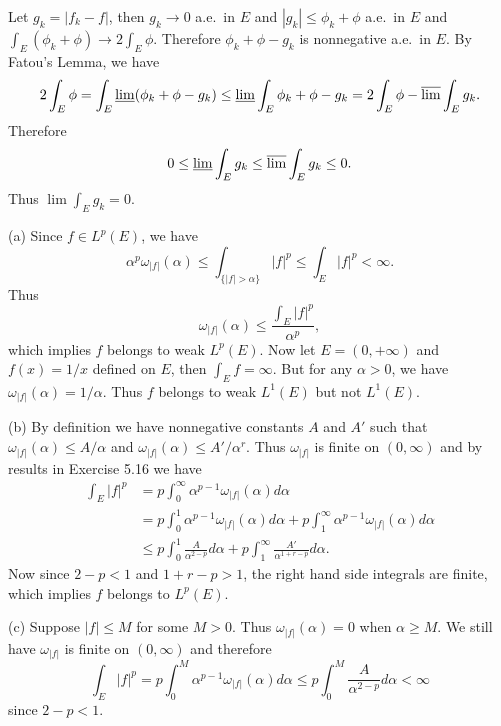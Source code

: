 \begin{exercise}{5.23}
  Let $g_k=|f_k-f|$, then $g_k\rightarrow 0$ a.e.\ in $E$
  and $|g_k|\leq \phi_k+\phi$ a.e.\ in $E$
  and $\int_E(\phi_k+\phi)\rightarrow 2\int_E\phi.$
  Therefore $\phi_k+\phi-g_k$ is nonnegative a.e.\ in $E$.
  By Fatou's Lemma, we have
  \[2\int_E\phi=\int_E\varliminf(\phi_k+\phi-g_k)\leq\varliminf\int_E\phi_k+\phi-g_k=2\int_E\phi-\varlimsup\int_Eg_k.\]
  Therefore \[0\leq\varliminf\int_E g_k\leq\varlimsup\int_Eg_k\leq 0.\]
  Thus $\lim\int_Eg_k=0.$
\end{exercise}

\begin{exercise}{5.24}
(a) Since $f\in L^p(E)$,
we have \[\alpha^p\omega_{|f|}(\alpha)\leq\int_{\{|f|>\alpha\}}|f|^p\leq\int_E|f|^p<\infty.\]
Thus \[\omega_{|f|}(\alpha)\leq\frac{\int_E|f|^p}{\alpha^p},\]
which implies $f$ belongs to weak $L^p(E)$.
Now let $E=(0,+\infty)$ and $f(x)=1/x$ defined on $E$,
then $\int_E f=\infty$.
But for any $\alpha>0$, we have $\omega_{|f|}(\alpha)=1/\alpha$.
Thus $f$ belongs to weak $L^1(E)$ but not $L^1(E)$.

(b) By definition we have nonnegative constants $A$ and $A'$ such that
$\omega_{|f|}(\alpha)\leq A/\alpha$ and $\omega_{|f|}(\alpha)\leq A'/\alpha^r$.
Thus $\omega_{|f|}$ is finite on $(0,\infty)$ and by results in Exercise 5.16 we have
\begin{align*}
  \int_E|f|^p&=p\int_0^\infty\alpha^{p-1}\omega_{|f|}(\alpha)d\alpha\\
  &=p\int_0^1\alpha^{p-1}\omega_{|f|}(\alpha)d\alpha+p\int_1^\infty\alpha^{p-1}\omega_{|f|}(\alpha)d\alpha\\
  &\leq p\int_0^1\frac{A}{\alpha^{2-p}}d\alpha+p\int_1^\infty \frac{A'}{\alpha^{1+r-p}}d\alpha.
\end{align*}
Now since $2-p<1$ and $1+r-p>1$, the right hand side integrals are finite,
which implies $f$ belongs to $L^p(E)$.

(c) Suppose $|f| \le M$ for some $M>0$.
Thus $\omega_{|f|}(\alpha)=0$ when $\alpha\geq M$.
We still have $\omega_{|f|}$ is finite on $(0,\infty)$ and therefore
\[\int_E|f|^p=p\int_0^M\alpha^{p-1}\omega_{|f|}(\alpha)d\alpha\leq p\int_0^M\frac{A}{\alpha^{2-p}}d\alpha<\infty\]
since $2-p<1.$
\end{exercise}
